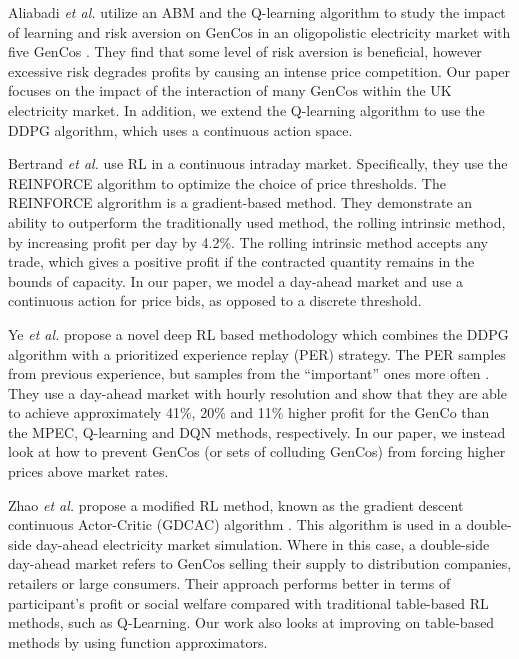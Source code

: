 \documentclass[conference]{IEEEtran}
\begin{document}
Aliabadi \textit{et al.} utilize an ABM and the Q-learning algorithm to study the impact of learning and risk aversion on GenCos in an oligopolistic electricity market with five GenCos \cite{EsmaeiliAliabadi2017}. They find that some level of risk aversion is beneficial, however excessive risk degrades profits by causing an intense price competition. Our paper focuses on the impact of the interaction of many GenCos within the UK electricity market. In addition, we extend the Q-learning algorithm to use the DDPG algorithm, which uses a continuous action space.

Bertrand \textit{et al.} use RL in a continuous intraday market. Specifically, they use the REINFORCE algorithm to optimize the choice of price thresholds. The REINFORCE algrorithm is a gradient-based method. They demonstrate an ability to outperform the traditionally used method, the rolling intrinsic method, by increasing profit per day by 4.2\%. The rolling intrinsic method accepts any trade, which gives a positive profit if the contracted quantity remains in the bounds of capacity. In our paper, we model a day-ahead market and use a continuous action for price bids, as opposed to a discrete threshold.

Ye \textit{et al.} propose a novel deep RL based methodology which combines the DDPG algorithm with a prioritized experience replay (PER) strategy. The PER samples from previous experience, but samples from the ``important'' ones more often \cite{Schaul2016}. They use a day-ahead market with hourly resolution and show that they are able to achieve approximately 41\%, 20\% and 11\% higher profit for the GenCo than the MPEC, Q-learning and DQN methods, respectively. In our paper, we instead look at how to prevent GenCos (or sets of colluding GenCos) from forcing higher prices above market rates.



Zhao \textit{et al.} propose a modified RL method, known as the gradient descent continuous Actor-Critic (GDCAC) algorithm \cite{Zhao2016}. This algorithm is used in a double-side day-ahead electricity market simulation. Where in this case, a double-side day-ahead market refers to GenCos selling their supply to distribution companies, retailers or large consumers. Their approach performs better in terms of participant's profit or social welfare compared with traditional table-based RL methods, such as Q-Learning. Our work also looks at improving on table-based methods by using function approximators.
\end{document}
